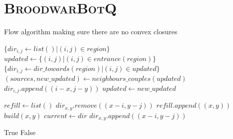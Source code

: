 \section{\textsc{BroodwarBotQ}}
\begin{algorithm}
\caption{Flow algorithm making sure there are no convex closures}
\label{alg:flood}
\begin{algorithmic}
    \State $\{dir_{i,j} \leftarrow list() | (i,j) \in region\}$
    \State $updated \leftarrow \{(i,j) | (i,j) \in entrance(region)\}$
    \State $\{dir_{i,j} \leftarrow dir\_towards(region) | (i,j) \in updated\}$
        \State $(sources,new\_updated) \leftarrow neighbours\_couples(updated)$
                \State $dir_{i,j}.append((i-x, j-y))$
            \EndIf
        \EndFor
        \State $updated \leftarrow new\_updated$
    \EndWhile
\EndFunction

\State $refill \leftarrow list()$
 
    \State $dir_{x,y}.remove((x-i, y-j))$
        \State $refill.append((x,y))$
        \State $build(x,y)$ 
    \EndIf
\EndFor
{} 
    \State $current \leftarrow dir$
            \State $dir_{x,y}.append((x-i, y-j))$
        \EndIf
    \EndFor
\EndWhile
\EndFunction


        \State \Return True
    \Else
        \State \Return False
    \EndIf
\EndFunction
\end{algorithmic}
\end{algorithm}

